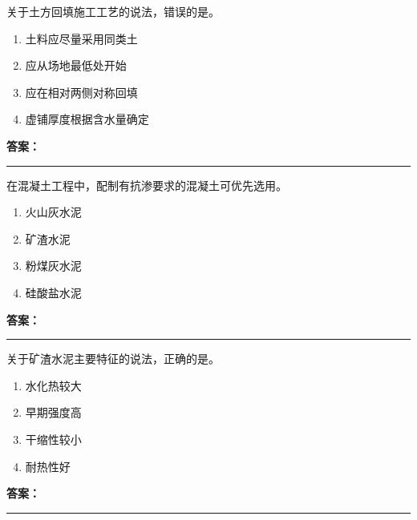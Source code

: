 \documentclass[UTF8,fontset=fandol,11pt]{ctexart}
\newcommand{\answerline}{\textcolor{answerred}{\rule{2.4cm}{0.7pt}}}
\begin{document}
\begin{quizbox}[title={乱序第 259 题｜第一章土方工程}]

关于土方回填施工工艺的说法，错误的是。\\

\begin{enumerate}[label=\Alph*.]

\item 土料应尽量采用同类土

\item 应从场地最低处开始

\item 应在相对两侧对称回填

\item 虚铺厚度根据含水量确定

\end{enumerate}

\textbf{\textcolor{answerred}{答案：}} \answerline

\end{quizbox}

\vspace{0.2em}

\begin{quizbox}[title={乱序第 260 题｜第四章混凝土结构工程}]

在混凝土工程中，配制有抗渗要求的混凝土可优先选用。\\

\begin{enumerate}[label=\Alph*.]

\item 火山灰水泥

\item 矿渣水泥

\item 粉煤灰水泥

\item 硅酸盐水泥

\end{enumerate}

\textbf{\textcolor{answerred}{答案：}} \answerline

\end{quizbox}

\vspace{0.2em}

\begin{quizbox}[title={乱序第 261 题｜第四章混凝土结构工程}]

关于矿渣水泥主要特征的说法，正确的是。\\

\begin{enumerate}[label=\Alph*.]

\item 水化热较大

\item 早期强度高

\item 干缩性较小

\item 耐热性好

\end{enumerate}

\textbf{\textcolor{answerred}{答案：}} \answerline

\end{quizbox}
\end{document}
